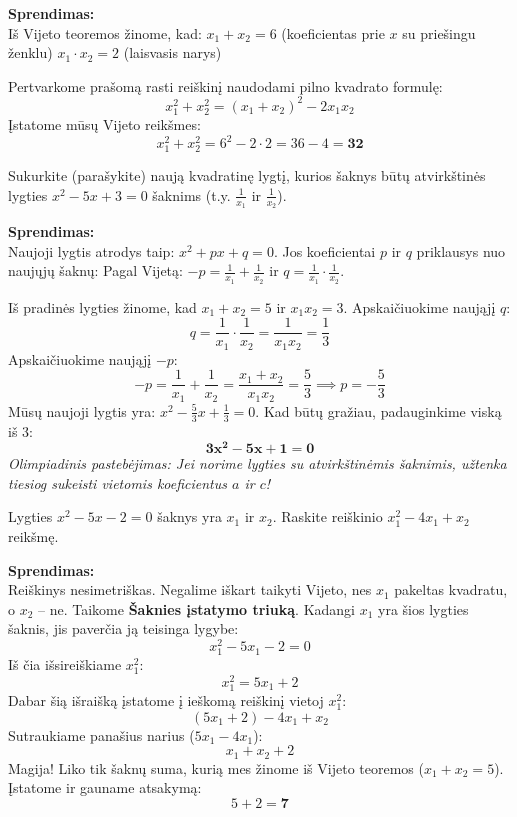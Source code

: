 \documentclass[11pt,a4paper]{scrartcl}
\begin{document}
\textbf{Sprendimas:}\\
Iš Vijeto teoremos žinome, kad:
$x_1 + x_2 = 6$ (koeficientas prie $x$ su priešingu ženklu)
$x_1 \cdot x_2 = 2$ (laisvasis narys)

Pertvarkome prašomą rasti reiškinį naudodami pilno kvadrato formulę:
\[ x_1^2 + x_2^2 = (x_1 + x_2)^2 - 2x_1x_2 \]
Įstatome mūsų Vijeto reikšmes:
\[ x_1^2 + x_2^2 = 6^2 - 2 \cdot 2 = 36 - 4 = \mathbf{32} \]

\begin{example}
Sukurkite (parašykite) naują kvadratinę lygtį, kurios šaknys būtų atvirkštinės lygties $x^2 - 5x + 3 = 0$ šaknims (t.y. $\frac{1}{x_1}$ ir $\frac{1}{x_2}$).
\end{example}

\textbf{Sprendimas:}\\
Naujoji lygtis atrodys taip: $x^2 + px + q = 0$. Jos koeficientai $p$ ir $q$ priklausys nuo naujųjų šaknų:
Pagal Vijetą: $-p = \frac{1}{x_1} + \frac{1}{x_2}$ ir $q = \frac{1}{x_1} \cdot \frac{1}{x_2}$.

Iš pradinės lygties žinome, kad $x_1 + x_2 = 5$ ir $x_1x_2 = 3$.
Apskaičiuokime naująjį $q$:
\[ q = \frac{1}{x_1} \cdot \frac{1}{x_2} = \frac{1}{x_1x_2} = \frac{1}{3} \]
Apskaičiuokime naująjį $-p$:
\[ -p = \frac{1}{x_1} + \frac{1}{x_2} = \frac{x_1 + x_2}{x_1x_2} = \frac{5}{3} \implies p = -\frac{5}{3} \]
Mūsų naujoji lygtis yra: $x^2 - \frac{5}{3}x + \frac{1}{3} = 0$.
Kad būtų gražiau, padauginkime viską iš 3:
\[ \mathbf{3x^2 - 5x + 1 = 0} \]
\textit{Olimpiadinis pastebėjimas: Jei norime lygties su atvirkštinėmis šaknimis, užtenka tiesiog sukeisti vietomis koeficientus $a$ ir $c$!}

\begin{example}
Lygties $x^2 - 5x - 2 = 0$ šaknys yra $x_1$ ir $x_2$. Raskite reiškinio $x_1^2 - 4x_1 + x_2$ reikšmę.
\end{example}
\textbf{Sprendimas:}\\
Reiškinys nesimetriškas. Negalime iškart taikyti Vijeto, nes $x_1$ pakeltas kvadratu, o $x_2$ – ne. Taikome \textbf{Šaknies įstatymo triuką}.
Kadangi $x_1$ yra šios lygties šaknis, jis paverčia ją teisinga lygybe:
\[ x_1^2 - 5x_1 - 2 = 0 \]
Iš čia išsireiškiame $x_1^2$:
\[ x_1^2 = 5x_1 + 2 \]
Dabar šią išraišką įstatome į ieškomą reiškinį vietoj $x_1^2$:
\[ (5x_1 + 2) - 4x_1 + x_2 \]
Sutraukiame panašius narius ($5x_1 - 4x_1$):
\[ x_1 + x_2 + 2 \]
Magija! Liko tik šaknų suma, kurią mes žinome iš Vijeto teoremos ($x_1 + x_2 = 5$).
Įstatome ir gauname atsakymą:
\[ 5 + 2 = \mathbf{7} \]
\end{document}
